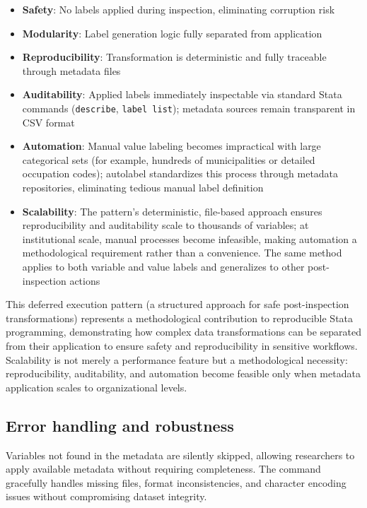 \begin{itemize}
\item \textbf{Safety}: No labels applied during inspection, eliminating corruption risk
\item \textbf{Modularity}: Label generation logic fully separated from application
\item \textbf{Reproducibility}: Transformation is deterministic and fully traceable through metadata files
\item \textbf{Auditability}: Applied labels immediately inspectable via standard Stata commands (\texttt{describe}, \texttt{label list}); metadata sources remain transparent in CSV format
\item \textbf{Automation}: Manual value labeling becomes impractical with large categorical sets (for example, hundreds of municipalities or detailed occupation codes); autolabel standardizes this process through metadata repositories, eliminating tedious manual label definition
\item \textbf{Scalability}: The pattern's deterministic, file-based approach ensures reproducibility and auditability scale to thousands of variables; at institutional scale, manual processes become infeasible, making automation a methodological requirement rather than a convenience. The same method applies to both variable and value labels and generalizes to other post-inspection actions
\end{itemize}

This deferred execution pattern (a structured approach for safe post-inspection transformations) represents a methodological contribution to reproducible Stata programming, demonstrating how complex data transformations can be separated from their application to ensure safety and reproducibility in sensitive workflows. Scalability is not merely a performance feature but a methodological necessity: reproducibility, auditability, and automation become feasible only when metadata application scales to organizational levels.

\subsection{Error handling and robustness}

Variables not found in the metadata are silently skipped, allowing researchers to apply available metadata without requiring completeness. The command gracefully handles missing files, format inconsistencies, and character encoding issues without compromising dataset integrity.

